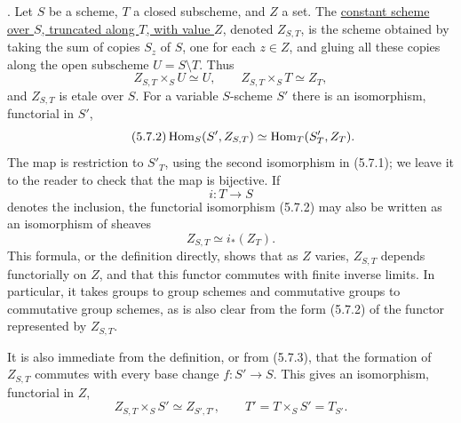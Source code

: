 
\medskip
{}.  Let $S$ be a scheme, $T$ a closed subscheme, and $Z$
a set.  The \underline{constant scheme over $S$, truncated along $T$,
with value $Z$}, denoted $Z_{S,T}$, is the scheme obtained by taking
the sum of copies $S_z$ of $S$, one for each $z\in Z$, and gluing all
these copies along the open subscheme $U=S\setminus T$.  Thus
\begin{equation}\tag{5.7.1}
 Z_{S,T}\times_S U\simeq U,
 \qquad
 Z_{S,T}\times_S T\simeq Z_T,
\end{equation}
and $Z_{S,T}$ is etale over $S$.  For a variable $S$-scheme $S'$
there is an isomorphism, functorial in $S'$,
\begin{equation}\tag{5.7.2}
 \operatorname{Hom}_S(S',Z_{S,T})\simeq\operatorname{Hom}_T(S'_T,Z_T).
\end{equation}
The map is restriction to $S'_T$, using the second isomorphism in
(5.7.1); we leave it to the reader to check that the map is bijective.
If
\[
 i:T\longrightarrow S
\]
denotes the inclusion, the functorial isomorphism (5.7.2) may also be
written as an isomorphism of sheaves
\begin{equation}\tag{5.7.3}
 Z_{S,T}\simeq i_*(Z_T).
\end{equation}
This formula, or the definition directly, shows that as $Z$ varies,
$Z_{S,T}$ depends functorially on $Z$, and that this functor commutes
with finite inverse limits.  In particular, it takes groups to group
schemes and commutative groups to commutative group schemes, as is also
clear from the form (5.7.2) of the functor represented by $Z_{S,T}$.

It is also immediate from the definition, or from (5.7.3), that the
formation of $Z_{S,T}$ commutes with every base change
$f:S'\to S$.  This gives an isomorphism, functorial in $Z$,
\begin{equation}\tag{5.7.4}
 Z_{S,T}\times_S S'\simeq Z_{S',T'},
 \qquad T'=T\times_S S'=T_{S'}.
\end{equation}

